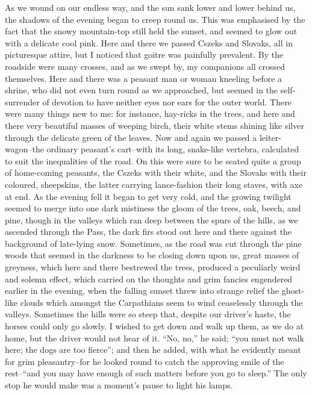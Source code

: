 \documentclass[12pt,openright]{book}
\begin{document}
As we wound on our endless way, and the sun sank lower and lower behind us, the shadows of the evening began to creep round us. This was emphasised by the fact that the snowy mountain-top still held the sunset, and seemed to glow out with a delicate cool pink. Here and there we passed Cszeks and Slovaks, all in picturesque attire, but I noticed that goitre was painfully prevalent. By the roadside were many crosses, and as we swept by, my companions all crossed themselves. Here and there was a peasant man or woman kneeling before a shrine, who did not even turn round as we approached, but seemed in the self-surrender of devotion to have neither eyes nor ears for the outer world. There were many things new to me: for instance, hay-ricks in the trees, and here and there very beautiful masses of weeping birch, their white stems shining like silver through the delicate green of the leaves. Now and again we passed a leiter-wagon–the ordinary peasant’s cart–with its long, snake-like vertebra, calculated to suit the inequalities of the road. On this were sure to be seated quite a group of home-coming peasants, the Cszeks with their white, and the Slovaks with their coloured, sheepskins, the latter carrying lance-fashion their long staves, with axe at end. As the evening fell it began to get very cold, and the growing twilight seemed to merge into one dark mistiness the gloom of the trees, oak, beech, and pine, though in the valleys which ran deep between the spurs of the hills, as we ascended through the Pass, the dark firs stood out here and there against the background of late-lying snow. Sometimes, as the road was cut through the pine woods that seemed in the darkness to be closing down upon us, great masses of greyness, which here and there bestrewed the trees, produced a peculiarly weird and solemn effect, which carried on the thoughts and grim fancies engendered earlier in the evening, when the falling sunset threw into strange relief the ghost-like clouds which amongst the Carpathians seem to wind ceaselessly through the valleys. Sometimes the hills were so steep that, despite our driver’s haste, the horses could only go slowly. I wished to get down and walk up them, as we do at home, but the driver would not hear of it. “No, no,” he said; “you must not walk here; the dogs are too fierce”; and then he added, with what he evidently meant for grim pleasantry–for he looked round to catch the approving smile of the rest–“and you may have enough of such matters before you go to sleep.” The only stop he would make was a moment’s pause to light his lamps.
\end{document}
